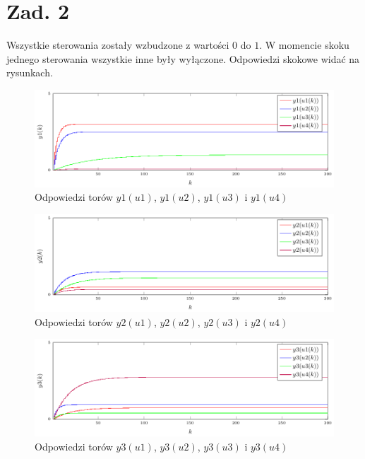 \documentclass[a4paper,titlepage,11pt,twosides,floatssmall]{mwrep}
\begin{document}
\chapter*{Zad. 2}
Wszystkie sterowania zostały wzbudzone z wartości $ 0 $ do $ 1 $. W momencie skoku jednego sterowania wszystkie inne były wyłączone. Odpowiedzi skokowe widać na rysunkach.

\begin{figure}[]
	\centering
	\includegraphics[scale=1]{../wykresy/zad2_y1.pdf}
	\caption{Odpowiedzi torów $y1(u1)$, $y1(u2)$, $y1(u3)$ i $y1(u4)$}
	\label{zad2_odpskok1}
\end{figure}


\begin{figure}[]
	\centering
	\includegraphics[scale=1]{../wykresy/zad2_y2.pdf}
	\caption{Odpowiedzi torów $y2(u1)$, $y2(u2)$, $y2(u3)$ i $y2(u4)$}
	\label{zad2_odpskok2}
\end{figure}

\begin{figure}[]
	\centering
	\includegraphics[scale=1]{../wykresy/zad2_y3.pdf}
	\caption{Odpowiedzi torów $y3(u1)$, $y3(u2)$, $y3(u3)$ i $y3(u4)$}
	\label{zad2_odpskok3}
\end{figure}
\end{document}

